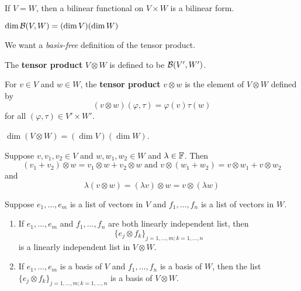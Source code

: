 \documentclass{extarticle}
\begin{document}
\begin{remark}
    If \(V = W\), then a bilinear functional on \(V \times W\) is a bilinear form.
\end{remark}

\begin{corollary}
    \(\dim \mathcal{B}(V, W) = (\dim V) ( \dim W)\)
\end{corollary}

\begin{remark}
    We want a \emph{basis-free} definition of the tensor product. 
\end{remark}

\begin{definition}
    The \textbf{tensor product} \(V \otimes W\) is defined to be \(\mathcal{B}(V', W')\). 

    For \(v \in V\) and \(w \in W\), the \textbf{tensor product} \(v \otimes w\) is the element 
    of \(V \otimes W\) defined by 
    \[(v \otimes w)(\varphi, \tau) = \varphi (v) \tau(w)\]
    for all \((\varphi, \tau) \in V' \times W'\). 
\end{definition}


\begin{corollary}
    \(\dim (V \otimes W) = (\dim V) (\dim W)\).
\end{corollary}

\begin{proposition}
    Suppose \(v, v_1, v_2 \in V\) and \(w, w_1, w_2 \in W\) and \(\lambda \in \mathbb{F}\). Then 
    \[(v_1 + v_2) \otimes w = v_1 \otimes w + v_2 \otimes w \text{   and   }
    v \otimes (w_1 +w_2) = v \otimes w_1 + v \otimes w_2\]
    and 
    \[\lambda \left( v \otimes w \right) = (\lambda v) \otimes w = v \otimes \left( \lambda w \right)\] 
\end{proposition}


\begin{thm}
    Suppose \(e_1, \ldots, e_m\) is a list of vectors in \(V\) and \(f_1, \ldots, f_n\) is a list 
    of vectors in \(W\). 

    \begin{enumerate}[label=(\alph*)]
        \item If \(e_1, \ldots, e_m\) and \(f_1, \ldots, f_n\) are both linearly independent list, then 
        \[\{e_j \otimes f_k\}_{j= 1, \ldots, m ; k = 1, \ldots, n}\]
        is a linearly independent list in \(V \otimes W\).

        \item If \(e_1, \ldots, e_m\) is a basis of \(V\) and \(f_1, \ldots, f_n\) is a basis of \(W\), then 
        the list \(\{e_j \otimes f_k\}_{j=1, \ldots, m; k = 1, \ldots, n}\) is a basis of \(V \otimes W\). 
    \end{enumerate}
\end{thm}
\end{document}
